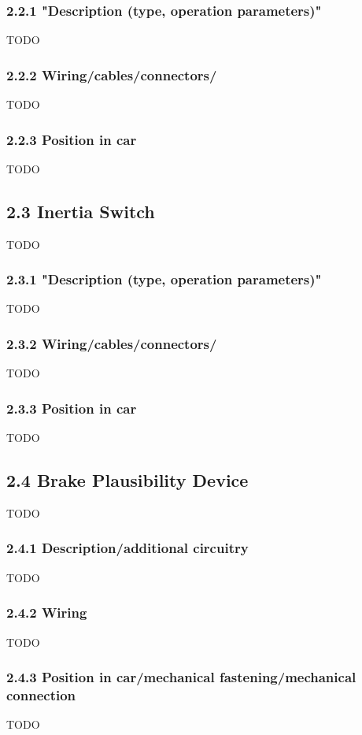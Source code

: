 \documentclass{article}
\begin{document}
\subsubsection*{2.2.1 "Description (type, operation parameters)"}
TODO

\subsubsection*{2.2.2 Wiring/cables/connectors/}
TODO

\subsubsection*{2.2.3 Position in car}
TODO

\subsection*{2.3 Inertia Switch}
TODO

\subsubsection*{2.3.1 "Description (type, operation parameters)"}
TODO

\subsubsection*{2.3.2 Wiring/cables/connectors/}
TODO

\subsubsection*{2.3.3 Position in car}
TODO

\subsection*{2.4 Brake Plausibility Device}
TODO

\subsubsection*{2.4.1 Description/additional circuitry}
TODO

\subsubsection*{2.4.2 Wiring}
TODO

\subsubsection*{2.4.3 Position in car/mechanical fastening/mechanical connection}
TODO
\end{document}
